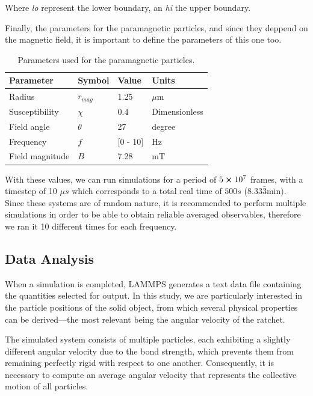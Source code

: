 Where \textit{lo} represent the lower boundary, an \textit{hi} the upper boundary.

Finally, the parameters for the paramagnetic particles, and since they deppend on the magnetic field, it is important to define the parameters of this one too.


\begin{table}[H]
\centering
\caption[Paramagnetic colloids parameters.]{Parameters used for the paramagnetic particles.}
\begin{tabular}{l l l l}
\hline
Parameter & Symbol  & Value & Units \\
\hline
Radius & $r_{mag}$ &  1.25 &\( \mu \mathrm{m}\) \\
Susceptibility & $\chi$ & 0.4 & Dimensionless\\
Field angle & $\theta$ & 27 & degree\\
Frequency & $f$ & [0 - 10] & Hz\\
Field magnitude & $B$ & 7.28 & mT\\
\hline
\end{tabular}
\end{table}

With these values, we can run simulations for a period of $5 \cross 10^7$ frames, with a timestep of 10 $\mu s$ which corresponds to a total real time of $500 s$ ($8.33\bar{3} \mathrm{min})$. Since these systems are of random nature, it is recommended to perform multiple simulations in order to be able to obtain reliable averaged observables, therefore we ran it 10 different times for each frequency.

\subsection{Data Analysis}

When a simulation is completed, LAMMPS generates a text data file containing the quantities selected for output. In this study, we are particularly interested in the particle positions of the solid object, from which several physical properties can be derived—the most relevant being the angular velocity of the ratchet.

The simulated system consists of multiple particles, each exhibiting a slightly different angular velocity due to the bond strength, which prevents them from remaining perfectly rigid with respect to one another. Consequently, it is necessary to compute an average angular velocity that represents the collective motion of all particles.


